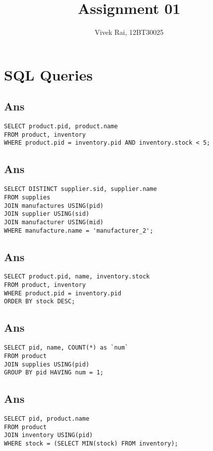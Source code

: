 \documentclass[a4]{article}
\title{Assignment 01}
\author{Vivek Rai, 12BT30025}
\begin{document}
\lstset{language=SQL}
\maketitle

\section{SQL Queries}
\subsection{Ans}
\begin{lstlisting}
SELECT product.pid, product.name
FROM product, inventory
WHERE product.pid = inventory.pid AND inventory.stock < 5;
\end{lstlisting}

\subsection{Ans}
\begin{lstlisting}
SELECT DISTINCT supplier.sid, supplier.name
FROM supplies
JOIN manufactures USING(pid)
JOIN supplier USING(sid)
JOIN manufacturer USING(mid)
WHERE manufacture.name = 'manufacturer_2';
\end{lstlisting}

\subsection{Ans}
\begin{lstlisting}
SELECT product.pid, name, inventory.stock
FROM product, inventory
WHERE product.pid = inventory.pid
ORDER BY stock DESC;
\end{lstlisting}

\subsection{Ans}
\begin{lstlisting}
SELECT pid, name, COUNT(*) as `num`
FROM product
JOIN supplies USING(pid)
GROUP BY pid HAVING num = 1;
\end{lstlisting}

\subsection{Ans}
\begin{lstlisting}
SELECT pid, product.name
FROM product
JOIN inventory USING(pid) 
WHERE stock = (SELECT MIN(stock) FROM inventory);
\end{lstlisting}
\end{document}
